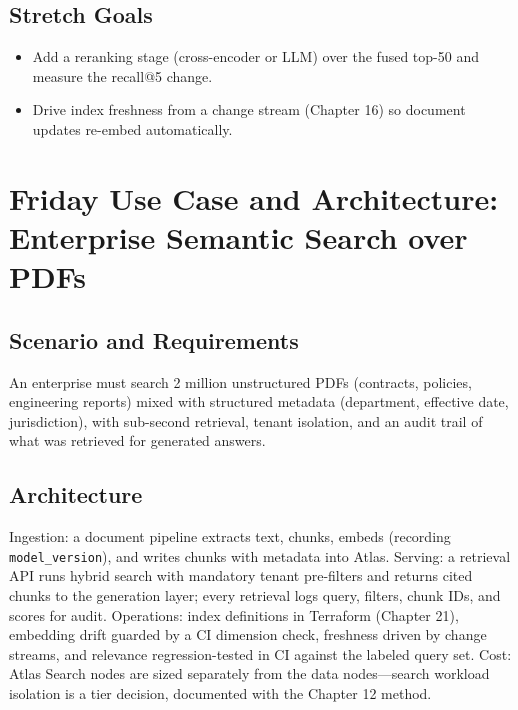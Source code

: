 \subsection*{Stretch Goals}
\begin{itemize}
    \item Add a reranking stage (cross-encoder or LLM) over the fused top-50 and measure the recall@5 change.
    \item Drive index freshness from a change stream (Chapter 16) so document updates re-embed automatically.
\end{itemize}

\section{Friday Use Case and Architecture: Enterprise Semantic Search over PDFs}
\subsection{Scenario and Requirements}
An enterprise must search 2 million unstructured PDFs (contracts, policies, engineering reports) mixed with structured metadata (department, effective date, jurisdiction), with sub-second retrieval, tenant isolation, and an audit trail of what was retrieved for generated answers.

\subsection{Architecture}
Ingestion: a document pipeline extracts text, chunks, embeds (recording \texttt{model\_version}), and writes chunks with metadata into Atlas. Serving: a retrieval API runs hybrid search with mandatory tenant pre-filters and returns cited chunks to the generation layer; every retrieval logs query, filters, chunk IDs, and scores for audit. Operations: index definitions in Terraform (Chapter 21), embedding drift guarded by a CI dimension check, freshness driven by change streams, and relevance regression-tested in CI against the labeled query set. Cost: Atlas Search nodes are sized separately from the data nodes---search workload isolation is a tier decision, documented with the Chapter 12 method.

